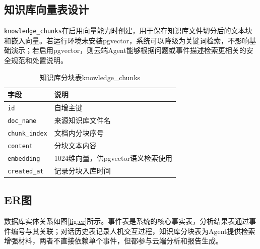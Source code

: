 \subsection{知识库向量表设计}

\verb|knowledge_chunks|在启用向量能力时创建，用于保存知识库文件切分后的文本块和嵌入向量。若运行环境未安装pgvector，系统可以降级为关键词检索，不影响基础演示；若启用pgvector，则云端Agent能够根据问题或事件描述检索更相关的安全规范和处置说明。

\begin{table}[H]
\caption{知识库分块表knowledge\_chunks}
\begin{center}
\begin{tabular}{lp{9.5cm}}
\toprule
字段 & 说明 \\
\midrule
\texttt{id} & 自增主键 \\
\texttt{doc\_name} & 来源知识库文件名 \\
\texttt{chunk\_index} & 文档内分块序号 \\
\texttt{content} & 分块文本内容 \\
\texttt{embedding} & 1024维向量，供pgvector语义检索使用 \\
\texttt{created\_at} & 记录分块入库时间 \\
\bottomrule
\end{tabular}
\end{center}
\label{tb:db-chunks}
\end{table}

\subsection{ER图}

数据库实体关系如图\ref{fig:er}所示。事件表是系统的核心事实表，分析结果表通过事件编号与其关联；对话历史表记录人机交互过程，知识库分块表为Agent提供检索增强材料，两者不直接依赖单个事件，但都参与云端分析和报告生成。

